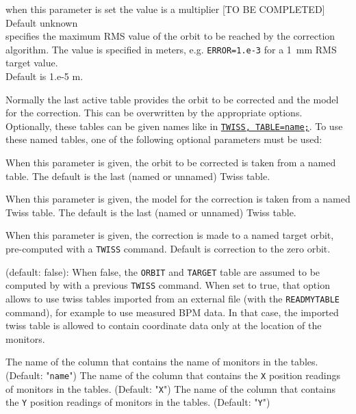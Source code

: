 \begin{madlist}
    when this parameter is set the value is a multiplier [TO BE COMPLETED] 
     \\ Default unknown \\

    specifies the maximum RMS value of the orbit to
     be reached by the correction algorithm. The value is specified in
     meters, e.g. {\tt ERROR=1.e-3} for a 1~mm RMS target value. 
     \\ Default is 1.e-5 m.\\

\end{madlist}

Normally the last active table provides the orbit to be
corrected and the model for the correction. This can be overwritten
by the appropriate options. Optionally, these tables can be given
names like in \hyperref[sec:twiss]{\tt TWISS, TABLE=name;}. 
To use these named tables, one of the following optional
parameters must be  used:  

\begin{madlist}
    When this parameter is given, the orbit to be corrected
     is taken from a named table. The default is the last (named or
     unnamed) Twiss table.  

    When this parameter is given, the model for the
     correction is taken from a named Twiss table. The default is the
     last (named or unnamed) Twiss table.  

    When this parameter is given, the correction is made to
     a named target orbit, pre-computed with a {\tt TWISS} command. Default is
     correction to the zero orbit.  

    (default: false): When false, the {\tt ORBIT} and 
     {\tt TARGET} table
     are assumed to be computed by \mad with a previous {\tt TWISS}
     command. When set to true, that option allows to use twiss tables
     imported from an external file (with the {\tt READMYTABLE} command), for
     example to use measured BPM data. In that case, the imported twiss
     table is allowed to contain coordinate data only at the location of
     the monitors.  
     
    The name of the column that contains the name of 
     monitors in the tables. (Default: "{\tt name}")
    The name of the column that contains the {\tt X} position 
     readings of monitors in the tables. (Default: "{\tt X}")
    The name of the column that contains the {\tt Y} position 
     readings of monitors in the tables. (Default: "{\tt Y}")
     
\end{madlist}

